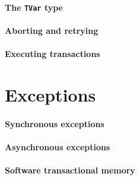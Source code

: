 \paragraph{The \texttt{TVar} type}

\paragraph{Aborting and retrying}

\paragraph{Executing transactions}

\section{Exceptions}
\label{sec:concurrent_haskell-exc}

\paragraph{Synchronous exceptions}

\paragraph{Asynchronous exceptions}

\paragraph{Software transactional memory}
